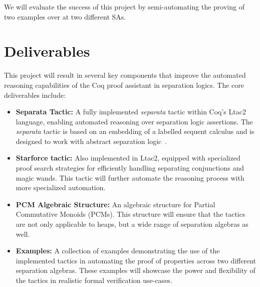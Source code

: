\documentclass[12pt,lettersize]{article}
\begin{document}
We will evaluate the success of this project by semi-automating the proving of two examples over at two different SAs.

\section{Deliverables}
This project will result in several key components that improve the automated reasoning capabilities of the Coq proof assistant in 
separation logics. The core deliverables include:

\begin{itemize}
\item \textbf{Separata Tactic:} A fully implemented \emph{separata} tactic within Coq's Ltac2 language, enabling automated
reasoning over separation logic assertions. The \emph{separata} tactic is based on an embedding of a labelled sequent calculus
and is designed to work with abstract separation logic~\cite{hou2017proof}.

\item \textbf{Starforce tactic:} Also implemented in Ltac2, equipped with specialized proof search strategies for efficiently handling
separating conjunctions and magic wands. This tactic will further automate the reasoning process with more specialized
automation.

\item \textbf{PCM Algebraic Structure:} An algebraic structure for Partial Commutative Monoids (PCMs).
This structure will ensure that the tactics are not only applicable to heaps, but a wide range of separation algebras as well.

\item \textbf{Examples:} A collection of examples demonstrating the use of the implemented tactics in automating the proof of properties
across two different separation algebras. These examples will showcase the power and flexibility of the tactics in realistic 
formal verification use-cases.
\end{itemize}



\end{document}
